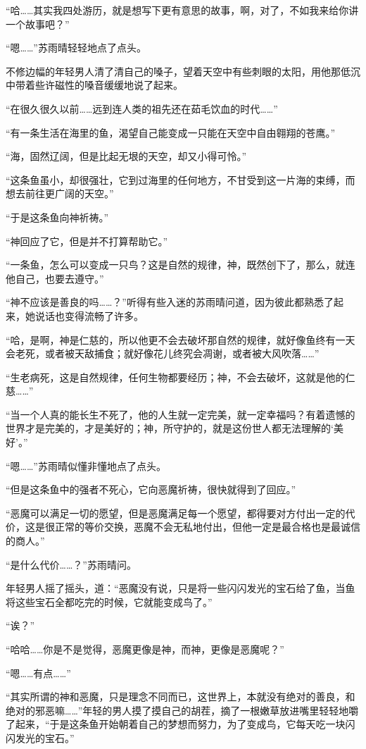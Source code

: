 “哈……其实我四处游历，就是想写下更有意思的故事，啊，对了，不如我来给你讲一个故事吧？”

“嗯……”苏雨晴轻轻地点了点头。

不修边幅的年轻男人清了清自己的嗓子，望着天空中有些刺眼的太阳，用他那低沉中带着些许磁性的嗓音缓缓地说了起来。

“在很久很久以前……远到连人类的祖先还在茹毛饮血的时代……”

“有一条生活在海里的鱼，渴望自己能变成一只能在天空中自由翱翔的苍鹰。”

“海，固然辽阔，但是比起无垠的天空，却又小得可怜。”

“这条鱼虽小，却很强壮，它到过海里的任何地方，不甘受到这一片海的束缚，而想去前往更广阔的天空。”

“于是这条鱼向神祈祷。”

“神回应了它，但是并不打算帮助它。”

“一条鱼，怎么可以变成一只鸟？这是自然的规律，神，既然创下了，那么，就连他自己，也要去遵守。”

“神不应该是善良的吗……？”听得有些入迷的苏雨晴问道，因为彼此都熟悉了起来，她说话也变得流畅了许多。

“哈，是啊，神是仁慈的，所以他更不会去破坏那自然的规律，就好像鱼终有一天会老死，或者被天敌捕食；就好像花儿终究会凋谢，或者被大风吹落……”

“生老病死，这是自然规律，任何生物都要经历；神，不会去破坏，这就是他的仁慈……”

“当一个人真的能长生不死了，他的人生就一定完美，就一定幸福吗？有着遗憾的世界才是完美的，才是美好的；神，所守护的，就是这份世人都无法理解的‘美好’。”

“嗯……”苏雨晴似懂非懂地点了点头。

“但是这条鱼中的强者不死心，它向恶魔祈祷，很快就得到了回应。”

“恶魔可以满足一切的愿望，但是恶魔满足每一个愿望，都得要对方付出一定的代价，这是很正常的等价交换，恶魔不会无私地付出，但他一定是最合格也是最诚信的商人。”

“是什么代价……？”苏雨晴问。

年轻男人摇了摇头，道：“恶魔没有说，只是将一些闪闪发光的宝石给了鱼，当鱼将这些宝石全都吃完的时候，它就能变成鸟了。”

“诶？”

“哈哈……你是不是觉得，恶魔更像是神，而神，更像是恶魔呢？”

“嗯……有点……”

“其实所谓的神和恶魔，只是理念不同而已，这世界上，本就没有绝对的善良，和绝对的邪恶嘛……”年轻的男人摸了摸自己的胡茬，摘了一根嫩草放进嘴里轻轻地嚼了起来，“于是这条鱼开始朝着自己的梦想而努力，为了变成鸟，它每天吃一块闪闪发光的宝石。”

